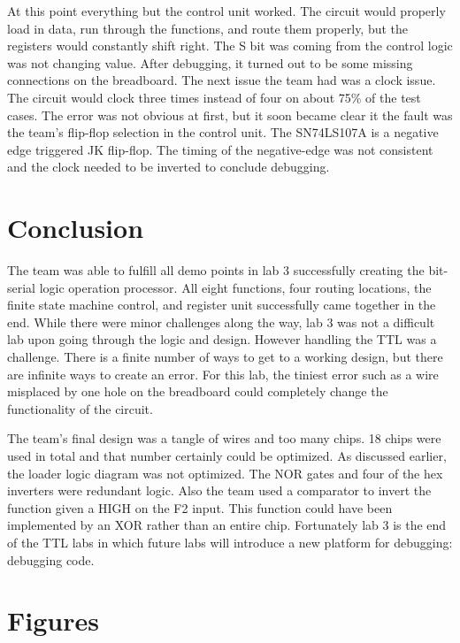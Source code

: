 \documentclass[journal, twocolumn, final,11pt,letterpaper]{IEEEtran}
\begin{document}
At this point everything but the control unit worked.  The circuit would properly load in data, run through the functions, and route them properly, but the registers would constantly shift right.  The S bit was coming from the control logic was not changing value.  After debugging, it turned out to be some missing connections on the breadboard.  The next issue the team had was a clock issue.  The circuit would clock three times instead of four on about 75\% of the test cases.  The error was not obvious at first, but it soon became clear it the fault was the team's flip-flop selection in the control unit.  The SN74LS107A is a negative edge triggered JK flip-flop.  The timing of the negative-edge was not consistent and the clock needed to be inverted to conclude debugging.      


\section{Conclusion}
The team was able to fulfill all demo points in lab 3 successfully creating the bit-serial logic operation processor. All eight functions, four routing locations, the finite state machine control, and register unit successfully came together in the end.  While there were minor challenges along the way, lab 3 was not a difficult lab upon going through the logic and design.  However handling the TTL was a challenge.  There is a finite number of ways to get to a working design, but there are infinite ways to create an error.  For this lab, the tiniest error such as a wire misplaced by one hole on the breadboard could completely change the functionality of the circuit.

The team's final design was a tangle of wires and too many chips.  18 chips were used in total and that number certainly could be optimized.  As discussed earlier, the loader logic diagram was not optimized. The NOR gates and four of the hex inverters were redundant logic. Also the team used a comparator to invert the function given a HIGH on the F2 input.  This function could have been implemented by an XOR rather than an entire chip. Fortunately lab 3 is the end of the TTL labs in which future labs will introduce a new platform for debugging: debugging code. 

 

\clearpage
\onecolumn
\section{Figures}
\end{document}
